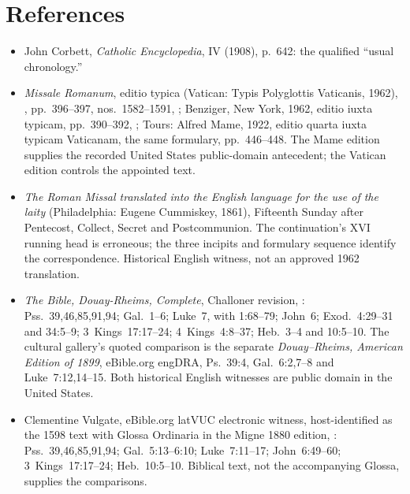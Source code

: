 \sectionguard
\section*{References}

{\TriptychReferenceFont
{}
\raggedright
\begin{itemize}[leftmargin=1.1em,labelsep=0.35em,itemsep=0.10em,topsep=0.15em,parsep=0pt]
\item John Corbett,  \emph{Catholic Encyclopedia}, IV (1908), p.~642: the qualified ``usual chronology.''
\item \emph{Missale Romanum}, editio typica (Vatican: Typis Polyglottis
Vaticanis, 1962), ,
pp.~396--397, nos.~1582--1591,
;
Benziger, New York, 1962, editio iuxta typicam, pp.~390--392,
;
Tours: Alfred Mame, 1922, editio quarta iuxta typicam Vaticanam, the
same formulary, pp.~446--448. The Mame edition supplies the recorded
United States public-domain antecedent; the Vatican edition controls the
appointed text.

\item \emph{The Roman Missal translated into the English language for the
use of the laity} (Philadelphia: Eugene Cummiskey, 1861), Fifteenth Sunday
after Pentecost, Collect, Secret and Postcommunion. The continuation's XVI
running head is erroneous; the three incipits and formulary sequence
identify the correspondence. Historical English witness, not an approved
1962 translation.

\item \emph{The Bible, Douay-Rheims, Complete}, Challoner revision,
:
Pss.~39,46,85,91,94; Gal.~1--6; Luke~7, with 1:68--79;
John~6; Exod.~4:29--31 and 34:5--9; 3~Kings~17:17--24;
4~Kings~4:8--37; Heb.~3--4 and 10:5--10.
The cultural gallery's quoted comparison is the separate
\emph{Douay--Rheims, American Edition of 1899}, eBible.org engDRA,
Ps.~39:4, Gal.~6:2,7--8 and Luke~7:12,14--15. Both historical English
witnesses are public domain in the United States.

\item Clementine Vulgate, eBible.org latVUC electronic witness,
host-identified as the 1598 text with Glossa Ordinaria in the Migne 1880
edition, :
Pss.~39,46,85,91,94; Gal.~5:13--6:10; Luke~7:11--17;
John~6:49--60; 3~Kings~17:17--24; Heb.~10:5--10.
Biblical text, not the accompanying Glossa, supplies the comparisons.


\end{itemize}}

